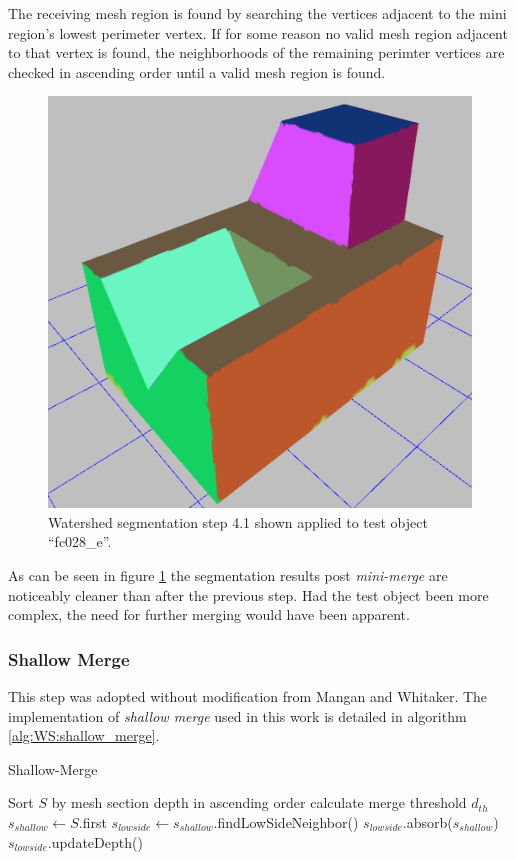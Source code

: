 The receiving mesh region is found by searching the vertices adjacent to the mini region's lowest perimeter vertex.
If for some reason no valid mesh region adjacent to that vertex is found, the neighborhoods of the remaining perimter vertices are checked in ascending order until a valid mesh region is found.

\begin{figure}[htb]
	\centering
	\includegraphics[width=0.5\linewidth]{../resources/watershed/fc028_WS4.1.png}
\caption{
Watershed segmentation step 4.1 shown applied to test object ``fc028\_e''.
}
	\label{fig:ws_4.1}
\end{figure}

As can be seen in figure \ref{fig:ws_4.1} the segmentation results post \textit{mini-merge} are noticeably cleaner than after the previous step.
Had the test object been more complex, the need for further merging would have been apparent.

\subsubsection{Shallow Merge}
This step was adopted without modification from Mangan and Whitaker.
The implementation of \textit{shallow merge} used in this work is detailed in algorithm \ref{alg:WS:shallow_merge}.

\begin{algorithm}[!b]
\caption{Shallow-Merge}\label{alg:WS:shallow_merge}
\begin{algorithmic}[1]
		\State Sort $S$ by mesh section depth in ascending order
		\State calculate merge threshold $d_{th}$
			\State $s_{shallow} \leftarrow S$.first
			\State $s_{lowside} \leftarrow s_{shallow}$.findLowSideNeighbor()
			\State $s_{lowside}$.absorb($s_{shallow}$)
			\State $s_{lowside}$.updateDepth()
		\EndWhile
	\EndFunction
\end{algorithmic}
\end{algorithm}


